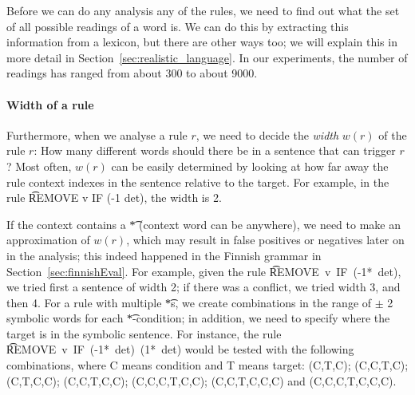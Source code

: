 
Before we can do any analysis any of the rules, we need to find out
what the set of all possible readings of a word is. We can do this by
extracting this information from a lexicon, but there are other ways
too; we will explain this in more detail in
Section~\ref{sec:realistic_language}. In our experiments, the number
of readings has ranged from about 300 to about 9000.

\paragraph{Width of a rule}
Furthermore, when we analyse a rule $r$, we need to decide the {\em width} $w(r)$ of the rule $r$: How many different words should there be in a sentence that can trigger $r$? Most often, $w(r)$ can be easily determined by looking at how far away the rule context indexes in the sentence relative to the target. For example, in the rule \t{REMOVE v IF (-1 det)}, the width is 2.

If the context contains a \t{*} (context word can be anywhere),
we need to make an approximation of $w(r)$, which may result in false positives or negatives later on in the analysis; this indeed happened in the Finnish grammar in Section~\ref{sec:finnishEval}. %
For example, given the rule \t{REMOVE~v~IF~(-1*~det)},
we tried first a sentence of width 2; if there was a conflict, we tried width 3, and then 4. For a rule with multiple \t{*}s, we create combinations in the range of $\pm$ 2 symbolic words for each \t{*}-condition;
in addition, we need to specify where the target is in the symbolic sentence.
For instance, the rule \t{REMOVE~v~IF~(-1*~det)~(1*~det)} would be tested
with the following combinations, where C means condition and T means target:
(C,T,C);
(C,C,T,C);
(C,T,C,C);
(C,C,T,C,C);
(C,C,C,T,C,C);
(C,C,T,C,C,C) and
(C,C,C,T,C,C,C).



